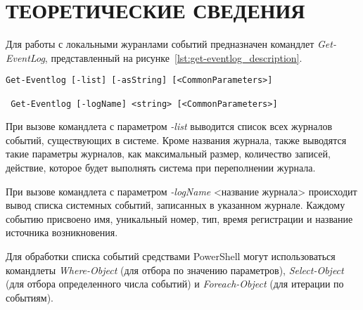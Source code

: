 \section{ТЕОРЕТИЧЕСКИЕ СВЕДЕНИЯ}

Для работы с локальными журанлами событий предназначен командлет \textit{Get-EventLog},
представленный на рисунке~\ref{lst:get-eventlog_description}. 

\begin{lstlisting}[caption=Синтаксис использования командлета Get-Eventlog, label=lst:get-eventlog_description]
 Get-Eventlog [-list] [-asString] [<CommonParameters>]
  
 Get-Eventlog [-logName] <string> [<CommonParameters>]
\end{lstlisting}

При вызове командлета с параметром \textit{-list} выводится список всех журналов событий, 
существующих в системе. Кроме названия журнала, также выводятся такие параметры журналов,
как максимальный размер, количество записей, действие, которое будет выполнять система
при переполнении журнала.

При вызове командлета с параметром \textit{-logName} <название журнала> происходит вывод списка 
системных событий, записанных в указанном журнале. Каждому событию присвоено имя,
уникальный номер, тип, время регистрации и название источника возникновения. 

Для обработки списка событий средствами PowerShell могут использоваться командлеты 
\textit{Where-Object} (для отбора по значению параметров), 
\textit{Select-Object} (для отбора определенного числа событий)
и \textit{Foreach-Object} (для итерации по событиям).

\newpage
